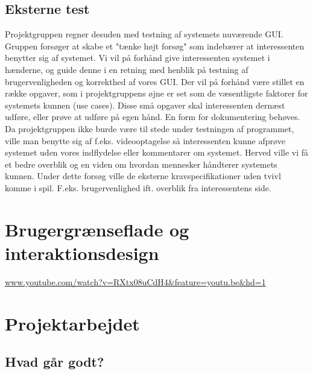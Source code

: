 \documentclass[a4paper,12pt]{article}
\begin{document}
\subsection{Eksterne test}Projektgruppen regner desuden med testning af systemets nuværende GUI. Gruppen forsøger at skabe et "tænke højt forsøg" som indebærer at interessenten benytter sig af systemet. Vi vil på forhånd give interessenten systemet i hænderne, og guide denne i en retning med henblik på testning af brugervenligheden og korrekthed af vores GUI. Der vil på forhånd være stillet en række opgaver, som i projektgruppens øjne er set som de væsentligste faktorer for systemets kunnen (use cases). Disse små opgaver skal interessenten dernæst udføre, eller prøve at udføre på egen hånd. En form for dokumentering behøves. 
Da projektgruppen ikke burde være til stede under testningen af programmet, ville man benytte sig af f.eks. videooptagelse så interessenten kunne afprøve systemet uden vores indflydelse eller kommentarer om systemet. Herved ville vi få et bedre overblik og en viden om hvordan mennesker håndterer systemets kunnen.
Under dette forsøg ville de eksterne kravspecifikationer uden tvivl komme i spil. F.eks. brugervenlighed ift. overblik fra
interessentens side.

\section{Brugergrænseflade og interaktionsdesign}
\url{www.youtube.com/watch?v=RXtx08uCdH4&feature=youtu.be&hd=1}

\section{Projektarbejdet}
\subsection{Hvad går godt?}
\end{document}
